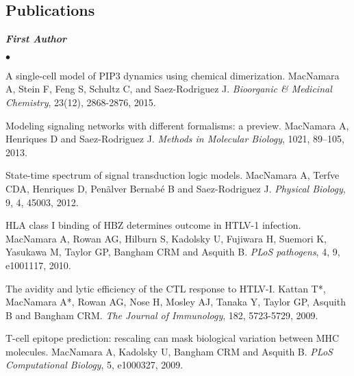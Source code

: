 \documentclass[overlapped, line, 11pt, letterpaper]{res}
\renewenvironment{itemize}{
\begin{list}{$\bullet$}
{\setlength{\itemsep}{0cm}}
}{\end{list}}
\begin{document}
\begin{resume}
\section{Publications}
\textbf{\emph{First Author}}
\begin{itemize}
\item A single-cell model of PIP3 dynamics using chemical dimerization. MacNamara A, Stein F, Feng S, Schultz C, and Saez-Rodriguez J. \emph{Bioorganic \& Medicinal Chemistry}, 23(12), 2868-2876, 2015.
\item Modeling signaling networks with different formalisms: a preview. MacNamara A, Henriques D and Saez-Rodriguez J. \emph{Methods in Molecular Biology}, 1021, 89–105, 2013.
\item State-time spectrum of signal transduction logic models. MacNamara A, Terfve CDA, Henriques D, Pen\~alver Bernab\'e B and Saez-Rodriguez J. \emph{Physical Biology}, 9, 4, 45003, 2012.
\item HLA class I binding of HBZ determines outcome in HTLV-1 infection. MacNamara A, Rowan AG, Hilburn S, Kadolsky U, Fujiwara H, Suemori K, Yasukawa M, Taylor GP, Bangham CRM and Asquith B. \emph{PLoS pathogens}, 4, 9, e1001117, 2010.
\item The avidity and lytic efficiency of the CTL response to HTLV-I. Kattan T*, MacNamara A*, Rowan AG, Nose H, Mosley AJ, Tanaka Y, Taylor GP, Asquith B and Bangham CRM. \emph{The Journal of Immunology}, 182, 5723-5729, 2009.
\item T-cell epitope prediction: rescaling can mask biological variation between MHC molecules. MacNamara A, Kadolsky U, Bangham CRM and Asquith B. \emph{PLoS Computational Biology}, 5, e1000327, 2009.
\end{itemize}


\end{resume}
\end{document}
